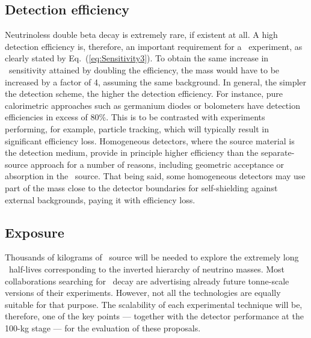 \documentclass{PoS}
\begin{document}
\subsection{Detection efficiency} \label{subsec:Efficiency}
Neutrinoless double beta decay is extremely rare, if existent at all. A high detection efficiency is, therefore, an important requirement for a \bb\ experiment, as clearly stated by Eq.~(\ref{eq:Sensitivity3}). To obtain the same increase in \mbb\ sensitivity attained by doubling the efficiency, the mass would have to be increased by a factor of 4, assuming the same background. In general, the simpler the detection scheme, the higher the detection efficiency. For instance, pure calorimetric approaches such as germanium diodes or bolometers have detection efficiencies in excess of 80\%. This is to be contrasted with experiments performing, for example, particle tracking, which will typically result in significant efficiency loss. Homogeneous detectors, where the source material is the detection medium, provide in principle higher efficiency than the separate-source approach for a number of reasons, including geometric acceptance or absorption in the \bb\ source. That being said, some homogeneous detectors may use part of the mass close to the detector boundaries for self-shielding against external backgrounds, paying it with efficiency loss.


\subsection{Exposure} \label{subsec:Exposure}
Thousands of kilograms of \bb\ source will be needed to explore the extremely long \bbonu\ half-lives corresponding to the inverted hierarchy of neutrino masses. Most collaborations searching for \bbonu\ decay are advertising already future tonne-scale versions of their experiments. However, not all the technologies are equally suitable for that purpose. The scalability of each experimental technique will be, therefore, one of the key points --- together with the detector performance at the 100-kg stage --- for the evaluation of these proposals.
\end{document}
